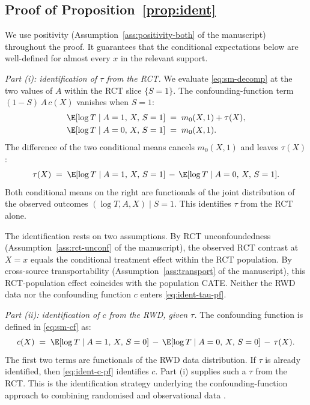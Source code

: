 \subsection{Proof of Proposition~\ref{prop:ident}}
We use positivity (Assumption~\ref{ass:positivity-both} of the manuscript) throughout the proof.
It guarantees that the conditional expectations below are well-defined for almost every $x$ in the relevant support.

\emph{Part (i): identification of $\tau$ from the RCT.}
We evaluate \eqref{eq:sm-decomp} at the two values of $A$ within the RCT slice $\{S = 1\}$.
The confounding-function term $(1 - S)\,A\,c(X)$ vanishes when $S = 1$:
\begin{align}
\E[\log T \mid A = 1,\, X,\, S = 1] &\;=\; m_0(X, 1) + \tau(X),\\
\E[\log T \mid A = 0,\, X,\, S = 1] &\;=\; m_0(X, 1).
\end{align}
The difference of the two conditional means cancels $m_0(X, 1)$ and leaves $\tau(X)$:
\begin{equation}
\tau(X) \;=\; \E[\log T \mid A = 1,\, X,\, S = 1] \,-\, \E[\log T \mid A = 0,\, X,\, S = 1].
\label{eq:ident-tau-pf}
\end{equation}
Both conditional means on the right are functionals of the joint distribution of the observed outcomes $(\log T, A, X) \mid S = 1$.
This identifies $\tau$ from the RCT alone.

The identification rests on two assumptions.
By RCT unconfoundedness (Assumption~\ref{ass:rct-unconf} of the manuscript), the observed RCT contrast at $X = x$ equals the conditional treatment effect within the RCT population.
By cross-source transportability (Assumption~\ref{ass:transport} of the manuscript), this RCT-population effect coincides with the population CATE.
Neither the RWD data nor the confounding function $c$ enters \eqref{eq:ident-tau-pf}.

\emph{Part (ii): identification of $c$ from the RWD, given $\tau$.}
The confounding function is defined in \eqref{eq:sm-cf} as:
\begin{equation}
c(X) \;=\; \E[\log T \mid A = 1,\, X,\, S = 0] \,-\, \E[\log T \mid A = 0,\, X,\, S = 0] \,-\, \tau(X).
\label{eq:ident-c-pf}
\end{equation}
The first two terms are functionals of the RWD data distribution.
If $\tau$ is already identified, then \eqref{eq:ident-c-pf} identifies $c$.
Part (i) supplies such a $\tau$ from the RCT.
This is the identification strategy underlying the confounding-function approach to combining randomised and observational data \citep{Kallus2018, YangLiuZengWang2025}.

